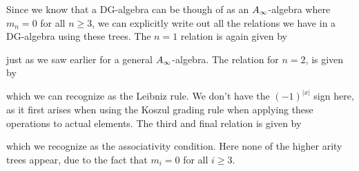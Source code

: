 Since we know that a DG-algebra can be though of as an $A_{\infty}$-algebra where $m_n = 0$ for all $n\geq 3$, we can explicitly write out all the relations we have in a DG-algebra using these trees. The $n=1$ relation is again given by


just as we saw earlier for a general $A_{\infty}$-algebra. The relation for $n=2$, is given by


which we can recognize as the Leibniz rule. We don't have the $(-1)^{|x|}$ sign here, as it first arises when using the Koszul grading rule when applying these operations to actual elements. The third and final relation is given by 


which we recognize as the associativity condition. Here none of the higher arity trees appear, due to the fact that $m_i=0$ for all $i\geq 3$. 